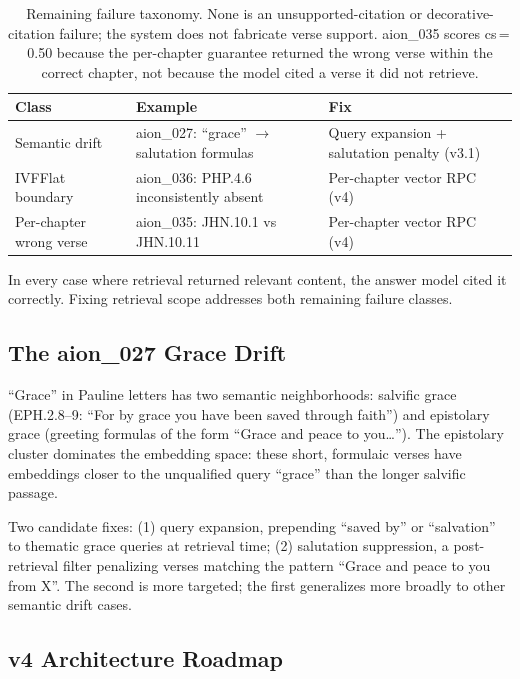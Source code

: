 \documentclass[11pt]{article}
\begin{document}
\begin{table}[t]
  \centering
  \small
  \begin{tabular}{@{}p{1.8cm}p{2.8cm}p{2.0cm}@{}}
    \toprule
    \textbf{Class} & \textbf{Example} & \textbf{Fix} \\
    \midrule
    Semantic drift & aion\_027: ``grace'' $\rightarrow$ salutation formulas & Query expansion + salutation penalty (v3.1) \\
    IVFFlat boundary & aion\_036: PHP.4.6 inconsistently absent & Per-chapter vector RPC (v4) \\
    Per-chapter wrong verse & aion\_035: JHN.10.1 vs JHN.10.11 & Per-chapter vector RPC (v4) \\
    \bottomrule
  \end{tabular}
  \caption{Remaining failure taxonomy. None is an unsupported-citation or decorative-citation failure; the system does not fabricate verse support. aion\_035 scores cs\,=\,0.50 because the per-chapter guarantee returned the wrong verse within the correct chapter, not because the model cited a verse it did not retrieve.}
  \label{tab:failures}
\end{table}

In every case where retrieval returned relevant content, the answer model cited it correctly.
Fixing retrieval scope addresses both remaining failure classes.

\subsection{The aion\_027 Grace Drift}

``Grace'' in Pauline letters has two semantic neighborhoods: salvific grace (EPH.2.8--9: ``For by grace you have been saved through faith'') and epistolary grace (greeting formulas of the form ``Grace and peace to you\ldots'').
The epistolary cluster dominates the embedding space: these short, formulaic verses have embeddings closer to the unqualified query ``grace'' than the longer salvific passage.

Two candidate fixes: (1) query expansion, prepending ``saved by'' or ``salvation'' to thematic grace queries at retrieval time; (2) salutation suppression, a post-retrieval filter penalizing verses matching the pattern ``Grace and peace to you from X''.
The second is more targeted; the first generalizes more broadly to other semantic drift cases.

\subsection{v4 Architecture Roadmap}
\end{document}
